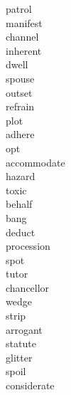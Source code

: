 \documentclass[b5paper, 11pt]{ctexart}
\begin{document}
\begin{multicols*}{3}
\begin{description}
\item[patrol]

\item[manifest]

\item[channel]

\item[inherent]

\item[dwell]

\item[spouse]

\item[outset]

\item[refrain]

\item[plot]

\item[adhere]

\item[opt]

\item[accommodate]

\item[hazard]

\item[toxic]

\item[behalf]

\item[bang]

\item[deduct]

\item[procession]

\item[spot]

\item[tutor]

\item[chancellor]

\item[wedge]

\item[strip]

\item[arrogant]

\item[statute]

\item[glitter]

\item[spoil]

\item[considerate]


\end{description}
\end{multicols*}
\end{document}

